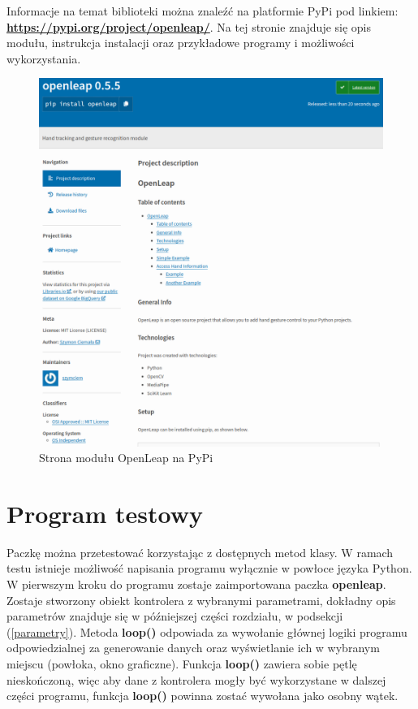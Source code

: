 \quad Informacje na temat biblioteki można znaleźć na platformie PyPi \cite{bib:pypi} pod linkiem: \textbf{\href{https://pypi.org/project/openleap/}{https://pypi.org/project/openleap/}}. Na tej stronie znajduje się opis modułu, instrukcja instalacji oraz przykładowe programy i możliwości wykorzystania.

\begin{figure}[H]
    \begin{center}
        \includegraphics[width=15cm]{../images/pypi_page.png}
        \caption{Strona modułu OpenLeap na PyPi}
    \end{center}
\end{figure}

\section{Program testowy}

\quad Paczkę można przetestować korzystając z dostępnych metod klasy. W ramach testu istnieje możliwość napisania programu wyłącznie w powłoce języka Python. W pierwszym kroku do programu zostaje zaimportowana paczka \textbf{openleap}. Zostaje stworzony obiekt kontrolera z wybranymi parametrami, dokładny opis parametrów znajduje się w późniejszej części rozdziału, w podsekcji (\ref{parametry}). Metoda \textbf{loop()} odpowiada za wywołanie głównej logiki programu odpowiedzialnej za generowanie danych oraz wyświetlanie ich w wybranym miejscu (powłoka, okno graficzne). Funkcja \textbf{loop()} zawiera sobie pętlę nieskończoną, więc aby dane z kontrolera mogły być wykorzystane w dalszej części programu, funkcja \textbf{loop()} powinna zostać wywołana jako osobny wątek.\newline

